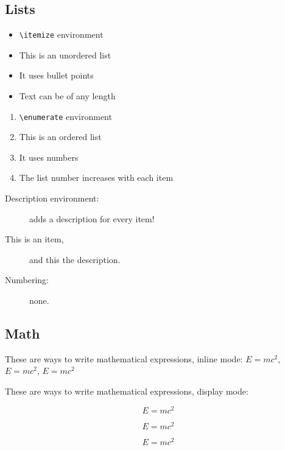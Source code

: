 \documentclass[12pt, letterpaper]{article} %
\begin{document}
\subsection*{Lists}

\begin{itemize}
  \item \verb+\itemize+ environment
  \item This is an unordered list
  \item It uses bullet points
  \item Text can be of any length
\end{itemize}

\begin{enumerate}
  \item \verb+\enumerate+ environment
  \item This is an ordered list
  \item It uses numbers
  \item The list number increases with each item
\end{enumerate}

\begin{description}
	\item[Description environment:] adds a description for every item!
	\item[This is an item,] and this the description.
	\item[Numbering:] none.
\end{description}

\subsection*{Math}

These are ways to write mathematical expressions, inline mode:
$E=mc^2$, 
\(E=mc^2\), 
\begin{math} E=mc^2 \end{math}

These are ways to write mathematical expressions, display mode:

\begin{equation} \label{eq:1} %
E=mc^2
\end{equation}

\[E=mc^2\] %

\begin{displaymath} %
E=mc^2
\end{displaymath}

\end{document}
